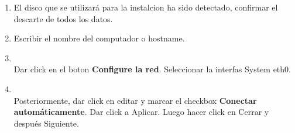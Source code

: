 \documentclass[11pt]{article}
\begin{document}
\begin{enumerate}
			\item El disco que se utilizará para la instalcion ha sido detectado, confirmar el descarte de todos los datos.
			\item Escribir el nombre del computador o hostname.
			\item 				
				\begin{minipage}[t]{\linewidth}
			          \raggedright
			          \medskip
			          \\Dar click en el boton \textbf{Configure la red}. Seleccionar la interfas System eth0.
			    \end{minipage}	

			\item
				\begin{minipage}[t]{\linewidth}
			          \raggedright
			          \medskip
			          \\Posteriormente, dar click en editar y marcar el checkbox \textbf{Conectar automáticamente}. Dar click a Aplicar. Luego hacer click en Cerrar y después Siguiente.
			    \end{minipage}	


\end{enumerate}
\end{document}
